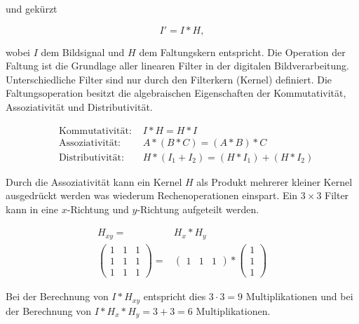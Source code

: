 und gekürzt

\begin{equation}
	I' = I * H,
\end{equation}

wobei $I$ dem Bildsignal und $H$ dem Faltungskern entspricht. Die Operation der Faltung ist die Grundlage aller
 linearen Filter in der digitalen Bildverarbeitung. Unterschiedliche Filter sind nur durch den Filterkern (Kernel)
 definiert. Die Faltungsoperation besitzt die algebraischen Eigenschaften der Kommutativität, Assoziativität und
 Distributivität.

\begin{align}
	&\text{Kommutativität: } &I * H = H * I\\
	&\text{Assoziativität: } &A * (B * C) = (A * B) * C\\
	&\text{Distributivität: } &H * \left(I_1 + I_2\right) = \left(H * I_1\right) + \left(H * I_2\right)
\end{align}

Durch die Assoziativität kann ein Kernel $H$ als Produkt mehrerer kleiner Kernel ausgedrückt werden was wiederum
 Rechenoperationen einspart. Ein $3 \times 3$ Filter kann in eine $x$-Richtung und $y$-Richtung aufgeteilt werden.

\begin{align}
	H_{xy} = & H_x * H_y\\
	\begin{pmatrix}
		1& 1& 1\\
		1& 1& 1\\
		1& 1& 1
	\end{pmatrix} = &
	\begin{pmatrix}
		1& 1& 1
	\end{pmatrix}
	*
	\begin{pmatrix}
		1\\
		1\\
		1
	\end{pmatrix}
\end{align}

Bei der Berechnung von $I * H_{xy}$ entspricht dies $3 \cdot 3 = 9$ Multiplikationen und bei der Berechnung von
 $I * H_x * H_y = 3 + 3 = 6$ Multiplikationen.


